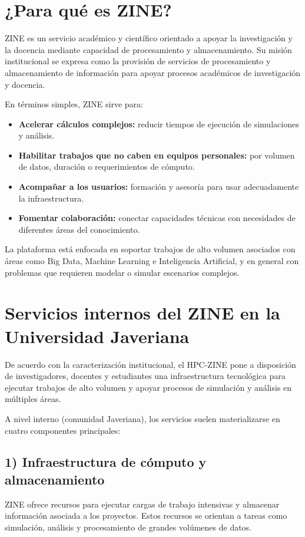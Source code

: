 \section{¿Para qué es ZINE?}
ZINE es un servicio académico y científico orientado a apoyar la investigación y la docencia mediante capacidad de procesamiento y almacenamiento. Su misión institucional se expresa como la provisión de servicios de procesamiento y almacenamiento de información para apoyar procesos académicos de investigación y docencia. \cite{zine_oficial}

En términos simples, ZINE sirve para:
\begin{itemize}
  \item \textbf{Acelerar cálculos complejos:} reducir tiempos de ejecución de simulaciones y análisis.
  \item \textbf{Habilitar trabajos que no caben en equipos personales:} por volumen de datos, duración o requerimientos de cómputo.
  \item \textbf{Acompañar a los usuarios:} formación y asesoría para usar adecuadamente la infraestructura.
  \item \textbf{Fomentar colaboración:} conectar capacidades técnicas con necesidades de diferentes áreas del conocimiento.
\end{itemize}

La plataforma está enfocada en soportar trabajos de alto volumen asociados con áreas como Big Data, Machine Learning e Inteligencia Artificial, y en general con problemas que requieren modelar o simular escenarios complejos. \cite{perfiles_capacidades_zine}

\section{Servicios internos del ZINE en la Universidad Javeriana}
De acuerdo con la caracterización institucional, el HPC-ZINE pone a disposición de investigadores, docentes y estudiantes una infraestructura tecnológica para ejecutar trabajos de alto volumen y apoyar procesos de simulación y análisis en múltiples áreas. \cite{perfiles_capacidades_zine}

A nivel interno (comunidad Javeriana), los servicios suelen materializarse en cuatro componentes principales:

\subsection*{1) Infraestructura de cómputo y almacenamiento}
ZINE ofrece recursos para ejecutar cargas de trabajo intensivas y almacenar información asociada a los proyectos. Estos recursos se orientan a tareas como simulación, análisis y procesamiento de grandes volúmenes de datos. \cite{zine_oficial,perfiles_capacidades_zine}

